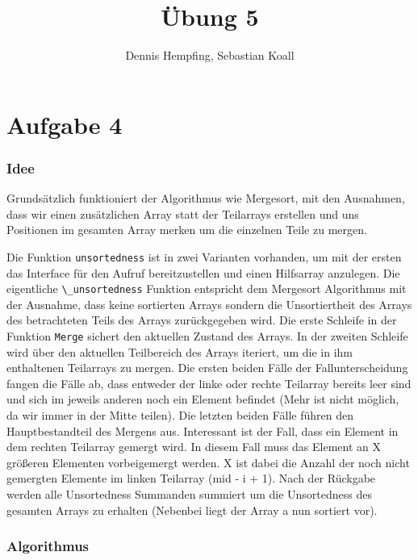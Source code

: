 \documentclass[12pt]{scrartcl}%
\theoremstyle{nonumberplain}
\newcommand{\code}[1]{\lstinline[basicstyle=\ttfamily\color{black}]{#1}}
\begin{document}
\author{Dennis Hempfing, Sebastian Koall}
\title{Übung 5}
\date{} 
\pagestyle{myheadings}

\maketitle %
 
\section*{Aufgabe 4}
\subsubsection*{Idee}
Grundsätzlich funktioniert der Algorithmus wie Mergesort, mit den Ausnahmen, dass wir einen zusätzlichen Array statt der Teilarrays erstellen und uns Positionen im gesamten Array merken um die einzelnen Teile zu mergen.

Die Funktion \code{unsortedness} ist in zwei Varianten vorhanden, um mit der ersten das Interface für den Aufruf bereitzustellen und einen Hilfsarray anzulegen. Die eigentliche \code{\_unsortedness} Funktion entspricht dem Mergesort Algorithmus mit der Ausnahme, dass keine sortierten Arrays sondern die Unsortiertheit des Arrays des betrachteten Teils des Arrays zurückgegeben wird. Die erste Schleife in der Funktion \code{Merge} sichert den aktuellen Zustand des Arrays. In der zweiten Schleife wird über den aktuellen Teilbereich des Arrays iteriert, um die in ihm enthaltenen Teilarrays zu mergen. Die ersten beiden Fälle der Fallunterscheidung fangen die Fälle ab, dass entweder der linke oder rechte Teilarray bereits leer sind und sich im jeweils anderen noch ein Element befindet (Mehr ist nicht möglich, da wir immer in der Mitte teilen). Die letzten beiden Fälle führen den Hauptbestandteil des Mergens aus. Interessant ist der Fall, dass ein Element in dem rechten Teilarray gemergt wird. In diesem Fall muss das Element an X größeren Elementen vorbeigemergt werden. X ist dabei die Anzahl der noch nicht gemergten Elemente im linken Teilarray (mid - i + 1). Nach der Rückgabe werden alle Unsortedness Summanden summiert um die Unsortedness des gesamten Arrays zu erhalten (Nebenbei liegt der Array a nun sortiert vor).

\subsubsection*{Algorithmus}
\end{document}
